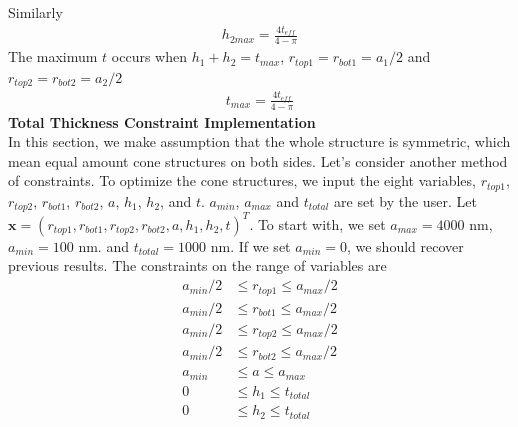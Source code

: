 \documentclass[12pt]{article}
\numberwithin{equation}{section}
\numberwithin{equation}{section}
\begin{document}
\begin{outline}[enumerate]
Similarly
\begin{align*}
h_{2max} = \frac {4t_{eff}}{4- \pi}
\end{align*}
The maximum $t$ occurs when $h_1 + h_2 = t_{max}$, $r_{top1} = r_{bot1} = a_1/2$ and $r_{top2} = r_{bot2} = a_2/2$
\begin{align*}
t_{max} = \frac {4t_{eff}}{4- \pi}
\end{align*}
\1 \textbf{Total Thickness Constraint Implementation} \\
In this section, we make assumption that the whole structure is symmetric, which mean equal amount cone structures on both sides. Let's consider another method of constraints. To optimize the cone structures, we input the eight variables, $r_{top1}$, $r_{top2}$, $r_{bot1}$, $r_{bot2}$, $a$, $h_1$, $h_2$, and $t$. $a_{min}$, $a_{max}$ and $t_{total}$ are set by the user. Let $\mathbf{x} = \left ( r_{top1}, r_{bot1}, r_{top2}, r_{bot2}, a, h_1, h_2, t  \right )^T $. To start with, we set $a_{max} = 4000$ nm, $a_{min} = 100$ nm.  and $t_{total} = 1000$ nm. If we set $a_{min} = 0$, we should recover previous results.
The constraints on the range of variables are
\begin{align*}
a_{min}/2 & \leq r_{top1} \leq a_{max}/2 \\
a_{min}/2 & \leq r_{bot1} \leq a_{max}/2 \\
a_{min}/2 & \leq r_{top2} \leq a_{max}/2 \\
a_{min}/2 & \leq r_{bot2} \leq a_{max}/2 \\
a_{min} & \leq a \leq a_{max} \\
0 & \leq h_1 \leq  t_{total}\\ 
0 & \leq h_2 \leq  t_{total}
\end{align*}


\end{outline}
\end{document}

